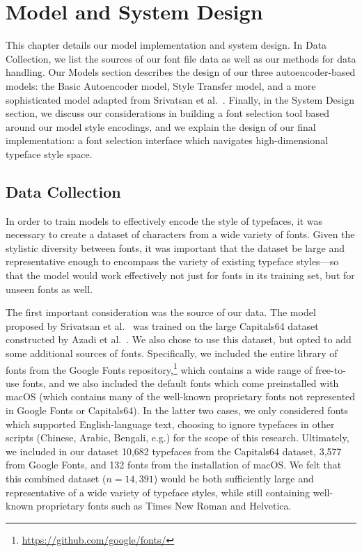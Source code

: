 \chapter{Model and System Design}
\label{chap:methodology}

This chapter details our model implementation and system design. In Data Collection, we list the sources of our font file data as well as our methods for data handling. Our Models section describes the design of our three autoencoder-based models: the Basic Autoencoder model, Style Transfer model, and a more sophisticated model adapted from Srivatsan et al.\ \cite{srivatsan2020}. Finally, in the System Design section, we discuss our considerations in building a font selection tool based around our model style encodings, and we explain the design of our final implementation: a font selection interface which navigates high-dimensional typeface style space.

\section{Data Collection} \label{data-collection}

In order to train models to effectively encode the style of typefaces, it was necessary to create a dataset of characters from a wide variety of fonts. Given the stylistic diversity between fonts, it was important that the dataset be large and representative enough to encompass the variety of existing typeface styles---so that the model would work effectively not just for fonts in its training set, but for unseen fonts as well.

The first important consideration was the source of our data. The model proposed by Srivatsan et al.\ \cite{srivatsan2020} was trained on the large Capitals64 dataset constructed by Azadi et al.\ \cite{azadi2017}. We also chose to use this dataset, but opted to add some additional sources of fonts. Specifically, we included the entire library of fonts from the Google Fonts repository,\footnote{\url{https://github.com/google/fonts/}} which contains a wide range of free-to-use fonts, and we also included the default fonts which come preinstalled with macOS (which contains many of the well-known proprietary fonts not represented in Google Fonts or Capitals64). In the latter two cases, we only considered fonts which supported English-language text, choosing to ignore typefaces in other scripts (Chinese, Arabic, Bengali, e.g.) for the scope of this research. Ultimately, we included in our dataset 10,682 typefaces from the Capitals64 dataset, 3,577 from Google Fonts, and 132 fonts from the installation of macOS. We felt that this combined dataset ($n = 14,391$) would be both sufficiently large and representative of a wide variety of typeface styles, while still containing well-known proprietary fonts such as Times New Roman and Helvetica.

